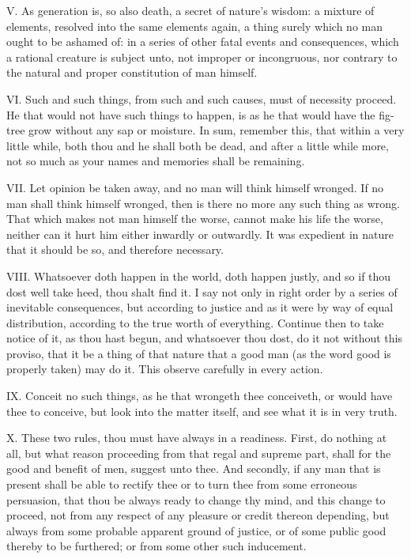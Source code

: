 V. As generation is, so also death, a secret of nature's wisdom: a
mixture of elements, resolved into the same elements again, a thing surely
which no man ought to be ashamed of: in a series of other fatal events and
consequences, which a rational creature is subject unto, not improper or
incongruous, nor contrary to the natural and proper constitution of man
himself.

VI. Such and such things, from such and such causes, must of necessity
proceed. He that would not have such things to happen, is as he that would
have the fig-tree grow without any sap or moisture. In sum, remember this,
that within a very little while, both thou and he shall both be dead, and
after a little while more, not so much as your names and memories shall be
remaining.

VII. Let opinion be taken away, and no man will think himself wronged.
If no man shall think himself wronged, then is there no more any such
thing as wrong. That which makes not man himself the worse, cannot make
his life the worse, neither can it hurt him either inwardly or outwardly.
It was expedient in nature that it should be so, and therefore necessary.

VIII. Whatsoever doth happen in the world, doth happen justly, and so if
thou dost well take heed, thou shalt find it. I say not only in right
order by a series of inevitable consequences, but according to justice and
as it were by way of equal distribution, according to the true worth of
everything. Continue then to take notice of it, as thou hast begun, and
whatsoever thou dost, do it not without this proviso, that it be a thing
of that nature that a good man (as the word good is properly taken) may do
it. This observe carefully in every action.

IX. Conceit no such things, as he that wrongeth thee conceiveth,
or would have thee to conceive, but look into the matter itself, and see
what it is in very truth.

X. These two rules, thou must have always in a readiness. First, do
nothing at all, but what reason proceeding from that regal and supreme
part, shall for the good and benefit of men, suggest unto thee. And
secondly, if any man that is present shall be able to rectify thee or to
turn thee from some erroneous persuasion, that thou be always ready to
change thy mind, and this change to proceed, not from any respect of any
pleasure or credit thereon depending, but always from some probable
apparent ground of justice, or of some public good thereby to be
furthered; or from some other such inducement.

